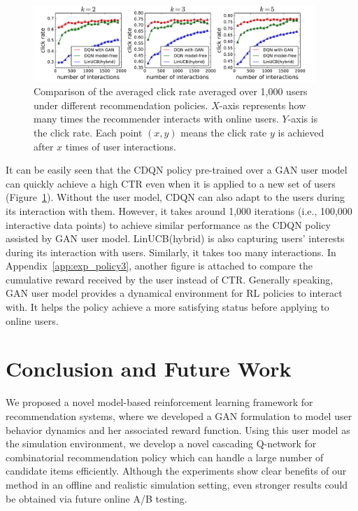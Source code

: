 \documentclass{article} %
\begin{document}
\begin{figure}[htbp]
\vspace{-4mm}
    \centering
    \includegraphics[width=0.95\textwidth]{Figs/policy_compare3_new.pdf}
    \vspace{-2.0mm}
\caption{\small Comparison of the averaged click rate averaged over 1,000 users under different recommendation policies. $X$-axis represents how many times the recommender interacts with online users. $Y$-axis is the click rate. Each point $(x,y)$ means the click rate $y$ is achieved after $x$ times of user interactions.}
\label{fg:experiment3}
\vspace{-3mm}
\end{figure}

It can be easily seen that the CDQN policy pre-trained over a {\small GAN} user model can quickly achieve a high CTR even when it is applied to a new set of users (Figure~\ref{fg:experiment3}). Without the user model, CDQN can also adapt to the users during its interaction with them. However, it takes around 1,000 iterations (i.e., 100,000 interactive data points) to achieve similar performance as the CDQN policy assisted by {\small GAN} user model. LinUCB(hybrid) is also capturing users' interests during its interaction with users. Similarly, it takes too many interactions. In Appendix~\ref{app:exp_policy3}, another figure is attached to compare the cumulative reward received by the user instead of CTR. Generally speaking, {\small GAN} user model provides a dynamical environment for RL policies to interact with. It helps the policy achieve a more satisfying status before applying to online users. 

\vspace{-3mm}
\section{Conclusion and Future Work}
\vspace{-3mm}

 We proposed a novel model-based reinforcement learning framework for recommendation systems, where we developed a GAN formulation to model user behavior dynamics and her associated reward function. Using this user model as the simulation environment, we develop a novel cascading Q-network for combinatorial recommendation policy which can handle a large number of candidate items efficiently. Although the experiments show clear benefits of our method in an offline and realistic simulation setting, even stronger results could be obtained via future online A/B testing. 
\end{document}

